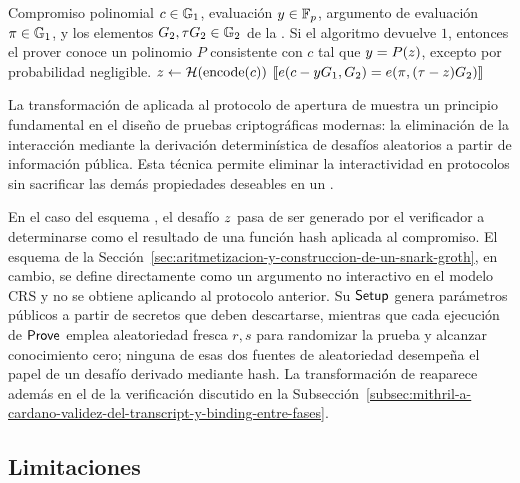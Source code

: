 \begin{algorithm}[ht]
	\caption{$\Verify_{FS}$ para el esquema \KZG}
	\label{alg:kzg-fs-verify}
	\begin{algorithmic}[1]
		\Require Compromiso polinomial $c \in \mathbb{G}_1$, evaluación $y \in \mathbb{F}_p$, argumento de evaluación $\pi \in \mathbb{G}_1$, y los elementos $G_2, \tau G_2 \in \mathbb{G}_2$ de la \SRS.
		\Ensure Si el algoritmo devuelve $1$, entonces el prover conoce un polinomio $P$ consistente con $c$ tal que $y = P(z)$, excepto por probabilidad negligible.
		\State $z \gets \mathcal{H}(\textnormal{encode}(c))$ 
		\State \Return $\left\llbracket e\!\left(c - yG_1,G_2\right) = e\!\left(\pi,(\tau - z) G_2\right) \right\rrbracket$
	\end{algorithmic}
\end{algorithm}

La transformación de \FiatShamir aplicada al protocolo de apertura de \KZG muestra un principio fundamental en el diseño de pruebas criptográficas modernas: la eliminación de la interacción mediante la derivación determinística de desafíos aleatorios a partir de información pública. Esta técnica permite eliminar la interactividad en protocolos sin sacrificar las demás propiedades deseables en un \SNARK.

En el caso del esquema \KZG, el desafío $z$ pasa de ser generado por el verificador a determinarse como el resultado de una función hash aplicada al compromiso. El esquema \Groth de la Sección~\ref{sec:aritmetizacion-y-construccion-de-un-snark-groth}, en cambio, se define directamente como un argumento no interactivo en el modelo CRS y no se obtiene aplicando \FiatShamir al protocolo anterior. Su $\mathsf{Setup}$ genera parámetros públicos a partir de secretos que deben descartarse, mientras que cada ejecución de $\mathsf{Prove}$ emplea aleatoriedad fresca $r,s$ para randomizar la prueba y alcanzar conocimiento cero; ninguna de esas dos fuentes de aleatoriedad desempeña el papel de un desafío derivado mediante hash. La transformación de \FiatShamir reaparece además en el \transcript de la verificación \HaloTwo discutido en la Subsección~\ref{subsec:mithril-a-cardano-validez-del-transcript-y-binding-entre-fases}.

\subsection{Limitaciones}
\label{subsec:apendice-b-fiat-shamir-limitaciones}

